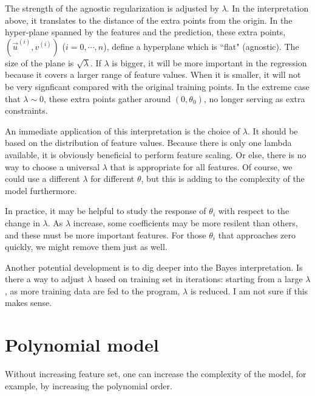 The strength of the agnostic regularization is adjusted by $\lambda$. In the interpretation above, it translates to the distance of the extra points 
from the origin. In the hyper-plane spanned by the features and the prediction, these extra points, $(\vec u^{(i)}, v^{(i)})$ ($i = 0, \cdots, n$), define a 
hyperplane which is ``flat" (agnostic). The size of the plane is $\sqrt\lambda$. If $\lambda$ is bigger, it will be more important in the regression because
it covers a larger range of feature values. When it is smaller, it will not be very signficant compared with the original training points. In the extreme
case that $\lambda\sim0$, these extra points gather around $(0, \theta_0)$, no longer serving as extra constraints.

An immediate application of this interpretation is the choice of $\lambda$. It should be based on the distribution of feature values. Because there is only
one lambda available, it is obviously beneficial to perform feature scaling. Or else, there is no way to choose a universal $\lambda$ that is appropriate 
for all features. Of course, we could use a different $\lambda$ for different $\theta$, but this is adding to the complexity of the model furthermore. 

In practice, it may be helpful to study the response of $\theta_i$ with respect to the change in $\lambda$. As $\lambda$ increase, some coefficients may 
be more resilent than others, and these must be more important features. For those $\theta_i$ that approaches zero quickly, we might 
remove them just as well.


Another potential development is to dig deeper into the Bayes interpretation. Is there a way to adjust $\lambda$ based on training set
in iterations: starting from a large $\lambda$, as more training data are fed to the program, $\lambda$ is reduced. I am not sure if this makes sense.


\section{Polynomial model}
Without increasing feature set, one can increase the complexity of the model, for example, by increasing the polynomial order. 

